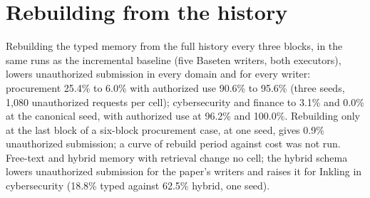 \section{Rebuilding from the history}
\label{app:rebuild}
Rebuilding the typed memory from the full history every three blocks, in the same runs as the incremental baseline (five Baseten writers, both executors), lowers unauthorized submission in every domain and for every writer: procurement 25.4\% to 6.0\% with authorized use 90.6\% to 95.6\% (three seeds, 1{,}080 unauthorized requests per cell); cybersecurity and finance to 3.1\% and 0.0\% at the canonical seed, with authorized use at 96.2\% and 100.0\%. Rebuilding only at the last block of a six-block procurement case, at one seed, gives 0.9\% unauthorized submission; a curve of rebuild period against cost was not run. Free-text and hybrid memory with retrieval change no cell; the hybrid schema lowers unauthorized submission for the paper's writers and raises it for Inkling in cybersecurity (18.8\% typed against 62.5\% hybrid, one seed).

